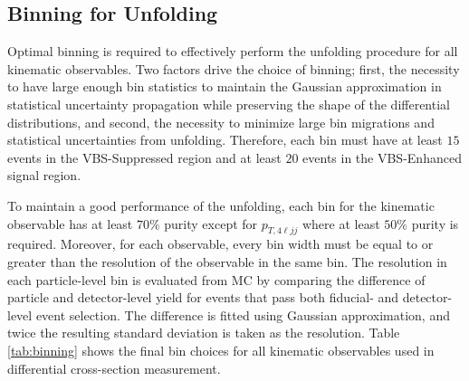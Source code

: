\subsection{Binning for Unfolding}
\label{subsec:Binning}
Optimal binning is required to effectively perform the unfolding procedure for all kinematic observables. Two factors drive the choice of binning; first, the necessity to have large enough bin statistics to maintain the Gaussian approximation in statistical uncertainty propagation while preserving the shape of the differential distributions, and second, the necessity to minimize large bin migrations and statistical uncertainties from unfolding. Therefore, each bin must have at least $15$ events in the VBS-Suppressed region and at least $20$ events in the VBS-Enhanced signal region. 

To maintain a good performance of the unfolding, each bin for the kinematic observable has at least $70\%$ purity except for $p_{T,4\ell jj}$ where at least $50\%$ purity is required. Moreover, for each observable, every bin width must be equal to or greater than the resolution of the observable in the same bin. The resolution in each particle-level bin is evaluated from MC by comparing the difference of particle and detector-level yield for events that pass both fiducial- and detector-level event selection. The difference is fitted using Gaussian approximation, and twice the resulting standard deviation is taken as the resolution. Table \ref{tab:binning} shows the final bin choices for all kinematic observables used in differential cross-section measurement.

